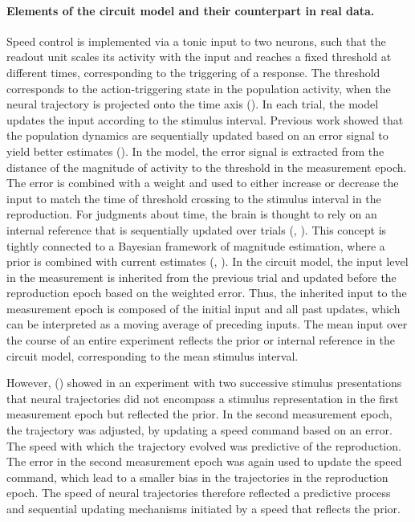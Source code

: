 \documentclass[10pt, a4paper]{article}
\begin{document}
\paragraph{Elements of the circuit model and their counterpart in real data.}
Speed control is implemented via a tonic input to two neurons, such that the readout unit scales its activity with the input and reaches a fixed threshold at different times, corresponding to the triggering of a response.  
The threshold corresponds to the action-triggering state in the population activity, when the neural trajectory is projected onto the time axis (\cite{Remington2018}).
In each trial, the model updates the input according to the stimulus interval.
Previous work showed that the population dynamics are sequentially updated based on an error signal to yield better estimates (\cite{Egger2019}).
In the model, the error signal is extracted from the distance of the magnitude of activity to the threshold in the measurement epoch. 
The error is combined with a weight and used to either increase or decrease the input to match the time of threshold crossing to the stimulus interval in the reproduction.
For judgments about time, the brain is thought to rely on an internal reference that is sequentially updated over trials (\cite{Dyjas2012}, \cite{Bausenhart2014}). This concept is tightly connected to a Bayesian framework of magnitude estimation, where a prior is combined with current estimates (\cite{Shi2013}, \cite{Petzschner2015}).
In the circuit model, the input level in the measurement is inherited from the previous trial and updated before the reproduction epoch based on the weighted error.
Thus, the inherited input to the measurement epoch is composed of the initial input and all past updates, which can be interpreted as a moving average of preceding inputs. 
The mean input over the course of an entire experiment reflects the prior or internal reference in the circuit model, corresponding to the mean stimulus interval.

However, \citeauthor{Egger2019} (\citeyear{Egger2019}) showed in an experiment with two successive stimulus presentations that neural trajectories did not encompass a stimulus representation in the first measurement epoch but reflected the prior.
In the second measurement epoch, the trajectory was adjusted, by updating a speed command based on an error. The speed with which the trajectory evolved was predictive of the reproduction.  
The error in the second measurement epoch was again used to update the speed command, which lead to a smaller bias in the trajectories in the reproduction epoch.
The speed of neural trajectories therefore reflected a predictive process and sequential updating mechanisms initiated by a speed that reflects the prior. 
\end{document}

